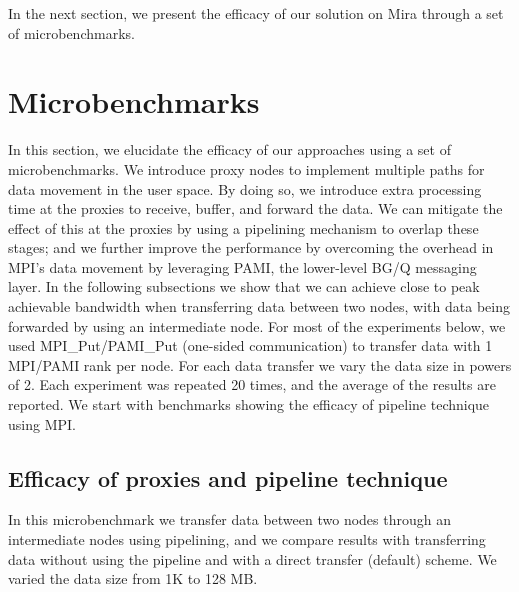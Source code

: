 \documentclass[final,5p,times]{elsarticle}
\begin{document}
In the next section, we present the efficacy of our solution on Mira through a set of microbenchmarks.

\section{Microbenchmarks}
\label{sec:microbenchmark}
In this section, we elucidate the efficacy of our approaches using a set of microbenchmarks.
We introduce proxy nodes to implement multiple paths for data movement in the user space. By doing so, we introduce extra processing time at the proxies to receive, buffer, and forward the data. We can mitigate the effect of this at the proxies by using a pipelining mechanism to overlap these stages; and we further improve the performance by overcoming the overhead in MPI's data movement by leveraging PAMI, the lower-level BG/Q messaging layer.
In the following subsections we show that we can achieve close to peak achievable bandwidth when transferring data between two nodes, with data being forwarded by using an intermediate node. For most of the experiments below, we used MPI\_Put/PAMI\_Put (one-sided communication) to transfer data with 1 MPI/PAMI rank per node. For each data transfer we vary the data size in powers of 2. Each experiment was repeated 20 times, and the average of the results are reported. We start with benchmarks showing the efficacy of pipeline technique using MPI.

\subsection{Efficacy of proxies and pipeline technique}

In this microbenchmark we transfer data between two nodes through an intermediate nodes using pipelining, and we compare results with transferring data without using the pipeline and with a direct transfer (default) scheme. We varied the data size from 1K  to 128 MB.
\end{document}
